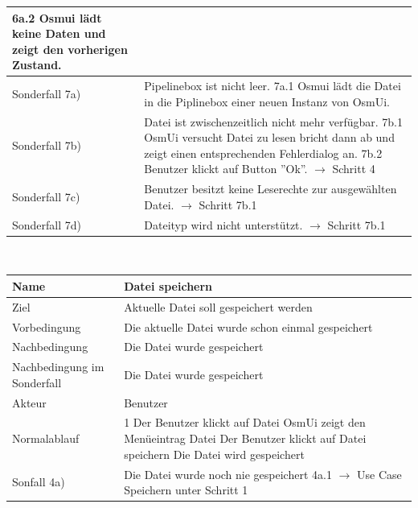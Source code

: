 \documentclass[a4paper,12pt]{scrartcl}
\begin{document}
\begin{center}
\begin{tabular}{|p{5cm}|p{10cm}|}
\newline 6a.2 Osmui lädt keine Daten und zeigt den vorherigen Zustand.\\
\hline Sonderfall 7a) & Pipelinebox ist nicht leer.
\newline 7a.1 Osmui lädt die Datei in die Piplinebox einer neuen Instanz von OsmUi.\\
\hline Sonderfall 7b)& Datei ist zwischenzeitlich nicht mehr verfügbar.
\newline 7b.1 OsmUi versucht Datei zu lesen bricht dann ab und zeigt einen entsprechenden Fehlerdialog an.
\newline 7b.2 Benutzer klickt auf Button ''Ok''.
\newline $ \rightarrow$ Schritt 4\\
\hline Sonderfall 7c)& Benutzer besitzt keine Leserechte zur ausgewählten Datei.
\newline $ \rightarrow$ Schritt 7b.1 \\
\hline Sonderfall 7d)& Dateityp wird nicht unterstützt.
\newline $ \rightarrow$ Schritt 7b.1 \\
\hline 
\end{tabular} 
\vspace{0.7cm}
\\
\begin{tabular}{|p{5cm}|p{10cm}|}
\hline Name & \textbf{Datei speichern} \\ 
\hline Ziel & Aktuelle Datei soll gespeichert werden \\ 
\hline Vorbedingung & Die aktuelle Datei wurde schon einmal gespeichert \\ 
\hline Nachbedingung & Die Datei wurde gespeichert \\ 
\hline Nachbedingung im Sonderfall & Die Datei wurde gespeichert \\ 
\hline Akteur & Benutzer \\ 
\hline Normalablauf & 1 Der Benutzer klickt auf Datei
\newline 2 OsmUi zeigt den Menüeintrag Datei
\newline 3 Der Benutzer klickt auf Datei speichern
\newline 4 Die Datei wird gespeichert\\
\hline Sonfall 4a) & Die Datei wurde noch nie gespeichert
\newline 4a.1 $ \rightarrow$ Use Case Speichern unter Schritt 1\\
\hline 
\end{tabular}
\vspace{0.7cm}

\end{center}
\end{document}
